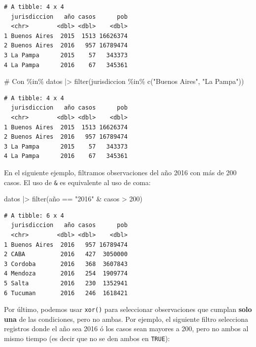 \documentclass[
  spanish,
  letterpaper,
  DIV=11,
  numbers=noendperiod]{scrreprt}
\newenvironment{Shaded}{\begin{snugshade}}{\end{snugshade}}
\newcommand{\CommentTok}[1]{\textcolor[rgb]{0.37,0.37,0.37}{#1}}
\newcommand{\DecValTok}[1]{\textcolor[rgb]{0.68,0.00,0.00}{#1}}
\newcommand{\FunctionTok}[1]{\textcolor[rgb]{0.28,0.35,0.67}{#1}}
\newcommand{\NormalTok}[1]{\textcolor[rgb]{0.00,0.23,0.31}{#1}}
\newcommand{\SpecialCharTok}[1]{\textcolor[rgb]{0.37,0.37,0.37}{#1}}
\newcommand{\StringTok}[1]{\textcolor[rgb]{0.13,0.47,0.30}{#1}}
\begin{document}
\begin{verbatim}
# A tibble: 4 x 4
  jurisdiccion   año casos      pob
  <chr>        <dbl> <dbl>    <dbl>
1 Buenos Aires  2015  1513 16626374
2 Buenos Aires  2016   957 16789474
3 La Pampa      2015    57   343373
4 La Pampa      2016    67   345361
\end{verbatim}

\begin{Shaded}
\begin{Highlighting}[]
\CommentTok{\# Con \%in\%}
\NormalTok{datos }\SpecialCharTok{|\textgreater{}}
  \FunctionTok{filter}\NormalTok{(jurisdiccion }\SpecialCharTok{\%in\%} \FunctionTok{c}\NormalTok{(}\StringTok{"Buenos Aires"}\NormalTok{, }\StringTok{"La Pampa"}\NormalTok{))}
\end{Highlighting}
\end{Shaded}

\begin{verbatim}
# A tibble: 4 x 4
  jurisdiccion   año casos      pob
  <chr>        <dbl> <dbl>    <dbl>
1 Buenos Aires  2015  1513 16626374
2 Buenos Aires  2016   957 16789474
3 La Pampa      2015    57   343373
4 La Pampa      2016    67   345361
\end{verbatim}

En el siguiente ejemplo, filtramos observaciones del año 2016 con más de
200 casos. El uso de \texttt{\&} es equivalente al uso de coma:

\begin{Shaded}
\begin{Highlighting}[]
\NormalTok{datos }\SpecialCharTok{|\textgreater{}}
  \FunctionTok{filter}\NormalTok{(año }\SpecialCharTok{==} \StringTok{"2016"} \SpecialCharTok{\&}\NormalTok{ casos }\SpecialCharTok{\textgreater{}} \DecValTok{200}\NormalTok{)}
\end{Highlighting}
\end{Shaded}

\begin{verbatim}
# A tibble: 6 x 4
  jurisdiccion   año casos      pob
  <chr>        <dbl> <dbl>    <dbl>
1 Buenos Aires  2016   957 16789474
2 CABA          2016   427  3050000
3 Cordoba       2016   368  3607843
4 Mendoza       2016   254  1909774
5 Salta         2016   230  1352941
6 Tucuman       2016   246  1618421
\end{verbatim}

Por último, podemos usar \texttt{xor()} para seleccionar observaciones
que cumplan \textbf{solo una} de las condiciones, pero no ambas. Por
ejemplo, el siguiente filtro selecciona registros donde el año sea 2016
ó los casos sean mayores a 200, pero no ambos al mismo tiempo (es decir
que no se den ambos en \texttt{TRUE}):
\end{document}
